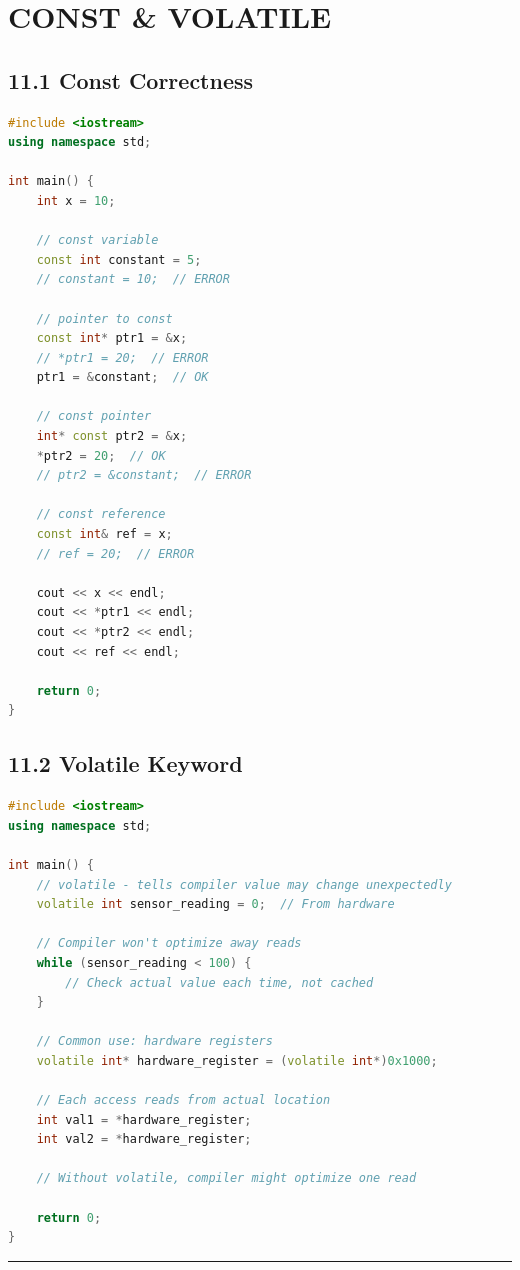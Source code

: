\hypertarget{const-volatile}{%
\chapter{CONST \& VOLATILE}\label{const-volatile}}

\hypertarget{const-correctness}{%
\section{11.1 Const Correctness}\label{const-correctness}}

\begin{lstlisting}[language={C++}]
#include <iostream>
using namespace std;

int main() {
    int x = 10;
    
    // const variable
    const int constant = 5;
    // constant = 10;  // ERROR
    
    // pointer to const
    const int* ptr1 = &x;
    // *ptr1 = 20;  // ERROR
    ptr1 = &constant;  // OK
    
    // const pointer
    int* const ptr2 = &x;
    *ptr2 = 20;  // OK
    // ptr2 = &constant;  // ERROR
    
    // const reference
    const int& ref = x;
    // ref = 20;  // ERROR
    
    cout << x << endl;
    cout << *ptr1 << endl;
    cout << *ptr2 << endl;
    cout << ref << endl;
    
    return 0;
}
\end{lstlisting}

\hypertarget{volatile-keyword}{%
\section{11.2 Volatile Keyword}\label{volatile-keyword}}

\begin{lstlisting}[language={C++}]
#include <iostream>
using namespace std;

int main() {
    // volatile - tells compiler value may change unexpectedly
    volatile int sensor_reading = 0;  // From hardware
    
    // Compiler won't optimize away reads
    while (sensor_reading < 100) {
        // Check actual value each time, not cached
    }
    
    // Common use: hardware registers
    volatile int* hardware_register = (volatile int*)0x1000;
    
    // Each access reads from actual location
    int val1 = *hardware_register;
    int val2 = *hardware_register;
    
    // Without volatile, compiler might optimize one read
    
    return 0;
}
\end{lstlisting}

\begin{center}\rule{0.5\linewidth}{0.5pt}\end{center}
